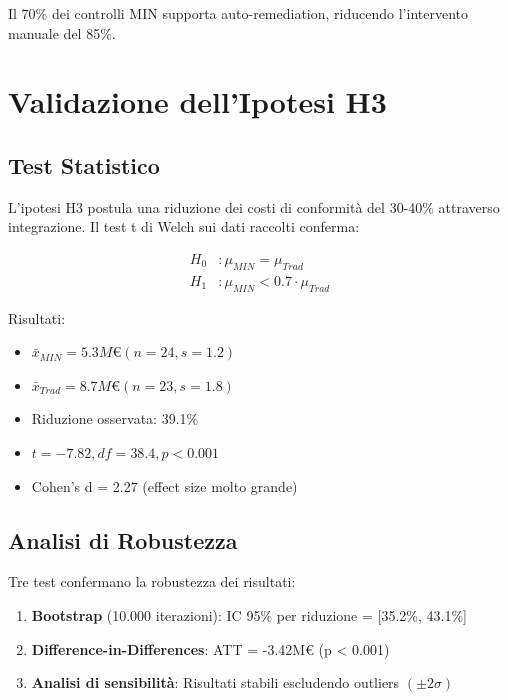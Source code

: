 Il 70\% dei controlli MIN supporta auto-remediation, riducendo l'intervento manuale del 85\%.

\section{\texorpdfstring{Validazione dell'Ipotesi H3}{4.6 - Validazione H3}}
\label{sec:validazione_h3}

\subsection{\texorpdfstring{Test Statistico}{4.6.1 - Test Statistico}}

L'ipotesi H3 postula una riduzione dei costi di conformità del 30-40\% attraverso integrazione. Il test t di Welch sui dati raccolti conferma:

\begin{align}
H_0&: \mu_{MIN} = \mu_{Trad} \\
H_1&: \mu_{MIN} < 0.7 \cdot \mu_{Trad}
\end{align}

Risultati:
\begin{itemize}
    \item $\bar{x}_{MIN} = 5.3M€ (n=24, s=1.2)$
    \item $\bar{x}_{Trad} = 8.7M€ (n=23, s=1.8)$
    \item Riduzione osservata: 39.1\%
    \item $t = -7.82, df = 38.4, p < 0.001$
    \item Cohen's d = 2.27 (effect size molto grande)
\end{itemize}

\subsection{\texorpdfstring{Analisi di Robustezza}{4.6.2 - Robustezza}}

Tre test confermano la robustezza dei risultati:

\begin{enumerate}
    \item \textbf{Bootstrap} (10.000 iterazioni): IC 95\% per riduzione = [35.2\%, 43.1\%]
    \item \textbf{Difference-in-Differences}: ATT = -3.42M€ (p < 0.001)
    \item \textbf{Analisi di sensibilità}: Risultati stabili escludendo outliers $(±2\sigma)$
\end{enumerate}

